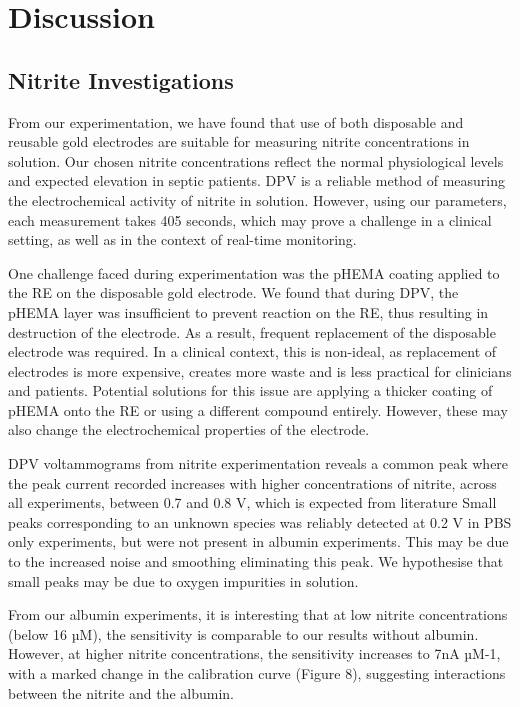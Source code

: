 \section{Discussion}

\subsection{Nitrite Investigations}
From our experimentation, we have found that use of both disposable and reusable gold electrodes are suitable for measuring nitrite concentrations in solution. Our chosen nitrite concentrations reflect the normal physiological levels and expected elevation in septic patients. DPV is a reliable method of measuring the electrochemical activity of nitrite in solution. However, using our parameters, each measurement takes 405 seconds, which may prove a challenge in a clinical setting, as well as in the context of real-time monitoring. 

One challenge faced during experimentation was the pHEMA coating applied to the RE on the disposable gold electrode. We found that during DPV, the pHEMA layer was insufficient to prevent reaction on the RE, thus resulting in destruction of the electrode. As a result, frequent replacement of the disposable electrode was required. In a clinical context, this is non-ideal, as replacement of electrodes is more expensive, creates more waste and is less practical for clinicians and patients. Potential solutions for this issue are applying a thicker coating of pHEMA onto the RE or using a different compound entirely. However, these may also change the electrochemical properties of the electrode. 

DPV voltammograms from nitrite experimentation reveals a common peak where the peak current recorded increases with higher concentrations of nitrite, across all experiments, between 0.7 and 0.8 V, which is expected from literature \cite{article} Small peaks corresponding to an unknown species was reliably detected at 0.2 V in PBS only experiments, but were not present in albumin experiments. This may be due to the increased noise and smoothing eliminating this peak. We hypothesise that small peaks may be due to oxygen impurities in solution. 

From our albumin experiments, it is interesting that at low nitrite concentrations (below 16 µM), the sensitivity is comparable to our results without albumin. However, at higher nitrite concentrations, the sensitivity increases to 7nA µM-1, with a marked change in the calibration curve (Figure 8), suggesting interactions between the nitrite and the albumin. 


